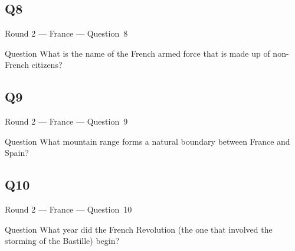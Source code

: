 \documentclass[11pt]{beamer}
\begin{document}
\subsection*{Q8}
\begin{frame}[t]{Round 2 --- France --- \mbox{Question 8}}
\begin{block}{Question}
What is the name of the French armed force that is made up of non-French citizens?
\end{block}
\end{frame}
\subsection*{Q9}
\begin{frame}[t]{Round 2 --- France --- \mbox{Question 9}}
\begin{block}{Question}
What mountain range forms a natural boundary between France and Spain?
\end{block}
\end{frame}
\subsection*{Q10}
\begin{frame}[t]{Round 2 --- France --- \mbox{Question 10}}
\begin{block}{Question}
What year did the French Revolution (the one that involved the storming of the Bastille) begin?
\end{block}
\end{frame}
\end{document}
